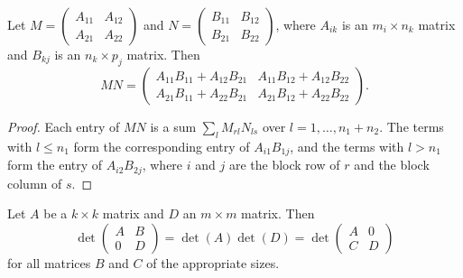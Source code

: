 \begin{proposition}\label{L1-prop:block-mult}
    Let $M = \begin{pmatrix} A_{11} & A_{12} \\ A_{21} & A_{22} \end{pmatrix}$ and $N = \begin{pmatrix} B_{11} & B_{12} \\ B_{21} & B_{22} \end{pmatrix}$, where $A_{ik}$ is an $m_i \times n_k$ matrix and $B_{kj}$ is an $n_k \times p_j$ matrix. Then
    \[MN = \begin{pmatrix} A_{11}B_{11} + A_{12}B_{21} & A_{11}B_{12} + A_{12}B_{22} \\ A_{21}B_{11} + A_{22}B_{21} & A_{21}B_{12} + A_{22}B_{22} \end{pmatrix}.\]
\end{proposition}

\begin{proof}
    Each entry of $MN$ is a sum $\sum_l M_{rl}N_{ls}$ over $l = 1, \ldots, n_1 + n_2$. The terms with $l \leq n_1$ form the corresponding entry of $A_{i1}B_{1j}$, and the terms with $l > n_1$ form the entry of $A_{i2}B_{2j}$, where $i$ and $j$ are the block row of $r$ and the block column of $s$.
\end{proof}

\begin{lemma}\label{L1-lem:block-triangular}
    Let $A$ be a $k \times k$ matrix and $D$ an $m \times m$ matrix. Then
    \[\det\begin{pmatrix} A & B \\ 0 & D \end{pmatrix} = \det(A)\det(D) = \det\begin{pmatrix} A & 0 \\ C & D \end{pmatrix}\]
    for all matrices $B$ and $C$ of the appropriate sizes.
\end{lemma}

